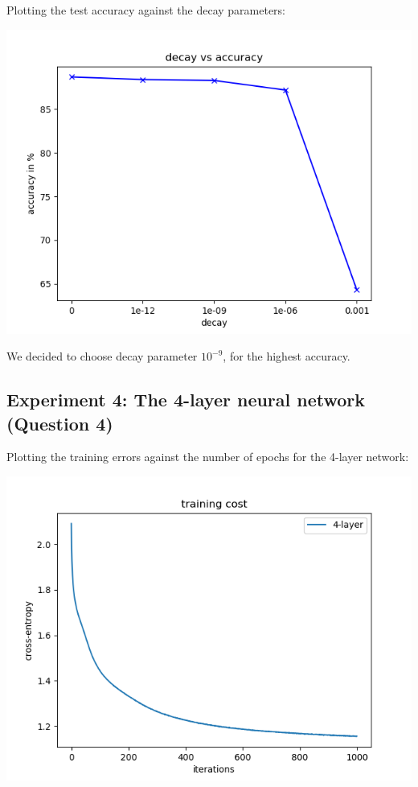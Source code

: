 Plotting the test accuracy against the decay parameters:

\begin{center}
    \includegraphics[width=\imgw]{images/p1a4_decay_accuracy.png}   
\end{center}

We decided to choose decay parameter \(10^{-9}\), for the highest accuracy.

\subsection*{Experiment 4: The 4-layer neural network (Question 4)}

Plotting the training errors against the number of epochs for the 4-layer
network:

\begin{center}
    \includegraphics[width=\imgw]{images/p1a5_4-layer_cost.png}   
\end{center}

